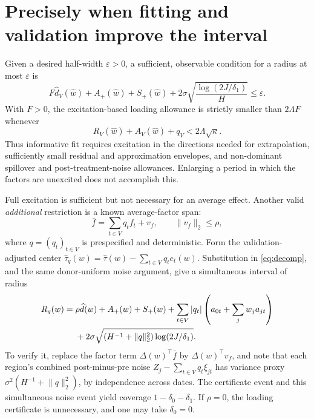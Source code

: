 \documentclass[11pt,a4paper]{article}
\newcommand{\norm}[1]{\lVert#1\rVert}
\begin{document}
\section{Precisely when fitting and validation improve the interval}
Given a desired half-width $\varepsilon>0$, a sufficient, observable condition for a radius at most $\varepsilon$ is
\begin{equation}\label{eq:informative}
 F\widehat d_V(\widehat w)+A_+(\widehat w)+S_+(\widehat w)
 +2\sigma\sqrt{\frac{\log(2J/\delta_1)}H}\le\varepsilon.
\end{equation}
With $F>0$, the excitation-based loading allowance is strictly smaller than $2\Lambda F$ whenever
\[
 R_V(\widehat w)+A_V(\widehat w)+q_V
 <2\Lambda\sqrt\kappa.
\]
Thus informative fit requires excitation in the directions needed for extrapolation, sufficiently small residual and approximation envelopes, and non-dominant spillover and post-treatment-noise allowances. Enlarging a period in which the factors are unexcited does not accomplish this.

Full excitation is sufficient but not necessary for an average effect. Another valid \emph{additional} restriction is a known average-factor span:
\begin{equation}\label{eq:knownspan}
 \bar f=\sum_{t\in V}q_tf_t+v_f,
 \qquad\norm{v_f}_2\le\rho,
\end{equation}
where $q=(q_t)_{t\in V}$ is prespecified and deterministic. Form the validation-adjusted center
$\widehat\tau_q(w)=\widehat\tau(w)-\sum_{t\in V}q_te_t(w)$.
Substitution in \eqref{eq:decomp}, and the same donor-uniform noise argument, give a simultaneous interval of radius
\begin{align}\label{eq:span-radius}
 R_q(w)={}&\rho\widehat d(w)+A_+(w)+S_+(w)
 +\sum_{t\in V}|q_t|\left(a_{0t}+\sum_jw_ja_{jt}\right)\notag\\
 &+2\sigma\sqrt{\left(H^{-1}+\norm q_2^2\right)
                         \log(2J/\delta_1)}.
\end{align}
To verify it, replace the factor term $\Delta(w)^\top\bar f$ by
$\Delta(w)^\top v_f$, and note that each region's combined post-minus-pre noise $Z_j-\sum_{t\in V}q_t\xi_{jt}$ has variance proxy $\sigma^2(H^{-1}+\norm q_2^2)$, by independence across dates. The certificate event and this simultaneous noise event yield coverage $1-\delta_0-\delta_1$. If $\rho=0$, the loading certificate is unnecessary, and one may take $\delta_0=0$.
\end{document}
